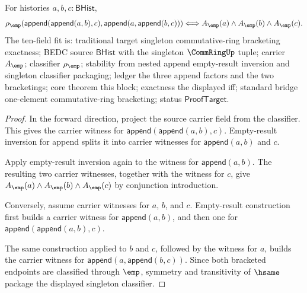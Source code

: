 \begin{theorem}
\label{thm:commring-singleton-classifier-append-assoc-carrier-iff}
For histories $a,b,c:\mathsf{BHist}$,
$$
\rho_{\emp}(\mathsf{append}(\mathsf{append}(a,b),c),
\mathsf{append}(a,\mathsf{append}(b,c)))
\Longleftrightarrow
A_{\emp}(a)\land A_{\emp}(b)\land A_{\emp}(c).
$$
The ten-field fit is: traditional target singleton commutative-ring bracketing
exactness; BEDC source $\mathsf{BHist}$ with the singleton $\CommRingUp$ tuple;
carrier $A_{\emp}$; classifier $\rho_{\emp}$; stability from nested append
empty-result inversion and singleton classifier packaging; ledger the three
append factors and the two bracketings; core theorem this block; exactness the
displayed iff; standard bridge one-element commutative-ring bracketing; status
$\mathsf{ProofTarget}$.
\end{theorem}
\begin{proof}
In the forward direction, project the source carrier field from the classifier.
This gives the carrier witness for
$\mathsf{append}(\mathsf{append}(a,b),c)$. Empty-result inversion for append
splits it into carrier witnesses for $\mathsf{append}(a,b)$ and $c$.

Apply empty-result inversion again to the witness for
$\mathsf{append}(a,b)$. The resulting two carrier witnesses, together with the
witness for $c$, give $A_{\emp}(a)\land A_{\emp}(b)\land A_{\emp}(c)$ by
conjunction introduction.

Conversely, assume carrier witnesses for $a$, $b$, and $c$. Empty-result
construction first builds a carrier witness for $\mathsf{append}(a,b)$, and then
one for $\mathsf{append}(\mathsf{append}(a,b),c)$.

The same construction applied to $b$ and $c$, followed by the witness for $a$,
builds the carrier witness for $\mathsf{append}(a,\mathsf{append}(b,c))$. Since
both bracketed endpoints are classified through $\emp$, symmetry and
transitivity of $\hsame$ package the displayed singleton classifier.
\end{proof}

